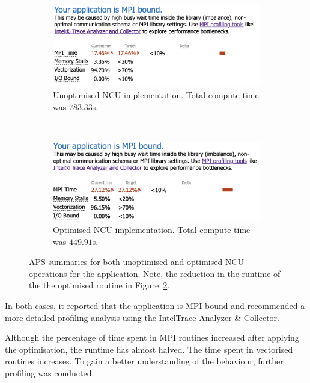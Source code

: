 \begin{figure}[H]%
    \centering
    \begin{subfigure}{.8\linewidth}
        \centering
        \includegraphics[width=1.\linewidth]{Images/VTUNE_APS/original.png}
		\caption{Unoptimised NCU implementation. Total compute time was $783.33$s.}
        \label{fig:aps_unopt_ncu}
    \end{subfigure}\\
    \begin{subfigure}{.8\linewidth}
        \centering
        \includegraphics[width=1.\linewidth]{Images/VTUNE_APS/ncu_opt.png}
		\caption{Optimised NCU implementation. Total compute time was $449.91$s.}
        \label{fig:aps_opt_ncu}
    \end{subfigure}
    \caption{APS summaries for both unoptimised and optimised NCU operations for the application. Note, the reduction in the runtime of the the optimised routine in Figure~\ref{fig:aps_opt_ncu}.}
        \label{fig:aps}
\end{figure}

In both cases, it reported that the application is MPI bound and recommended a more detailed profiling analysis using the Intel\textregistered Trace Analyzer \& Collector.

Although the percentage of time spent in MPI routines increased after applying the optimisation, the runtime has almost halved. The time spent in vectorised routines increases. To gain a better understanding of the behaviour, further profiling was conducted.


